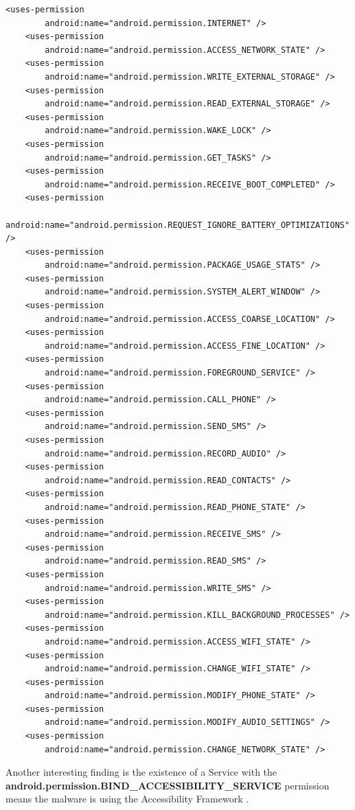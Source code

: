 \documentclass[10pt,titlepage]{article}
\begin{document}
\begin{lstlisting}[label=usedpermissions,caption=Permissions defined in the Manifest of the malware,frame=tb]
	<uses-permission
        android:name="android.permission.INTERNET" />
    <uses-permission
        android:name="android.permission.ACCESS_NETWORK_STATE" />
    <uses-permission
        android:name="android.permission.WRITE_EXTERNAL_STORAGE" />
    <uses-permission
        android:name="android.permission.READ_EXTERNAL_STORAGE" />
    <uses-permission
        android:name="android.permission.WAKE_LOCK" />
    <uses-permission
        android:name="android.permission.GET_TASKS" />
    <uses-permission
        android:name="android.permission.RECEIVE_BOOT_COMPLETED" />
    <uses-permission
        android:name="android.permission.REQUEST_IGNORE_BATTERY_OPTIMIZATIONS" />
    <uses-permission
        android:name="android.permission.PACKAGE_USAGE_STATS" />
    <uses-permission
        android:name="android.permission.SYSTEM_ALERT_WINDOW" />
    <uses-permission
        android:name="android.permission.ACCESS_COARSE_LOCATION" />
    <uses-permission
        android:name="android.permission.ACCESS_FINE_LOCATION" />
    <uses-permission
        android:name="android.permission.FOREGROUND_SERVICE" />
    <uses-permission
        android:name="android.permission.CALL_PHONE" />
    <uses-permission
        android:name="android.permission.SEND_SMS" />
    <uses-permission
        android:name="android.permission.RECORD_AUDIO" />
    <uses-permission
        android:name="android.permission.READ_CONTACTS" />
    <uses-permission
        android:name="android.permission.READ_PHONE_STATE" />
    <uses-permission
        android:name="android.permission.RECEIVE_SMS" />
    <uses-permission
        android:name="android.permission.READ_SMS" />
    <uses-permission
        android:name="android.permission.WRITE_SMS" />
    <uses-permission
        android:name="android.permission.KILL_BACKGROUND_PROCESSES" />
    <uses-permission
        android:name="android.permission.ACCESS_WIFI_STATE" />
    <uses-permission
        android:name="android.permission.CHANGE_WIFI_STATE" />
    <uses-permission
        android:name="android.permission.MODIFY_PHONE_STATE" />
    <uses-permission
        android:name="android.permission.MODIFY_AUDIO_SETTINGS" />
    <uses-permission
        android:name="android.permission.CHANGE_NETWORK_STATE" />
\end{lstlisting}

Another interesting finding is the existence of a Service with the \textbf{android.permission.BIND\_ACCESSIBILITY\_SERVICE} permission means the malware is using the Accessibility Framework \cite[/guide/topics/ui/accessibility/service]{AndroidDev}.
\end{document}
